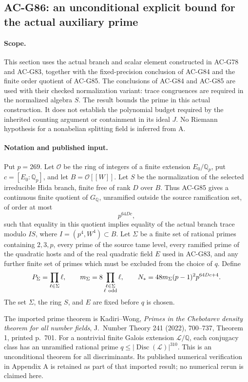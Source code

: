 \subsection{AC-G86: an unconditional explicit bound for the actual auxiliary prime}
\label{sec:cubic-effective-actual-prime}

\paragraph{Scope.}
This section uses the actual branch and scalar element constructed in AC-G78 and AC-G83, together with the fixed-precision conclusion of AC-G84 and the finite order quotient of AC-G85. The conclusions of AC-G84 and AC-G85 are used with their checked normalization variant: trace congruences are required in the normalized algebra \(S\). The result bounds the prime in this actual construction. It does not establish the polynomial budget required by the inherited counting argument or containment in its ideal \(J\). No Riemann hypothesis for a nonabelian splitting field is inferred from A.

\paragraph{Notation and published input.}
Put \(p=269\). Let \(\mathcal O\) be the ring of integers of a finite extension \(E_0/\mathbb Q_p\), put \(c=[E_0:\mathbb Q_p]\), and let \(B=\mathcal O[[W]]\). Let \(S\) be the normalization of the selected irreducible Hida branch, finite free of rank \(D\) over \(B\). Thus AC-G85 gives a continuous finite quotient of \(G_{\mathbb Q}\), unramified outside the source ramification set, of order at most
\[
 p^{64Dc},
\]
such that equality in this quotient implies equality of the actual branch trace modulo
\(I S\), where \(I=(p^4,W^4)\subset B\).
Let \(\Sigma\) be a finite set of rational primes containing \(2,3,p\), every prime of the source tame level, every ramified prime of the quadratic hosts and of the real quadratic field \(E\) used in AC-G83, and any further finite set of primes which must be excluded from the choice of \(q\). Define
\[
 P_\Sigma=\prod_{\ell\in\Sigma}\ell,\qquad
 m_\Sigma=8\prod_{\substack{\ell\in\Sigma\\\ell\ {\rm odd}}}\ell,
 \qquad
 N_*=48m_\Sigma(p-1)^2p^{64Dc+4}.
\]
The set \(\Sigma\), the ring \(S\), and \(E\) are fixed before \(q\) is chosen.

The imported prime theorem is Kadiri--Wong, \emph{Primes in the Chebotarev density theorem for all number fields}, J.\ Number Theory 241 (2022), 700--737, Theorem 1, printed p.\ 701. For a nontrivial finite Galois extension \(\mathcal L/\mathbb Q\), each conjugacy class has an unramified rational prime \(q\leq |\operatorname{Disc}(\mathcal L)|^{310}\). This is an unconditional theorem for all discriminants. Its published numerical verification in Appendix A is retained as part of that imported result; no numerical rerun is claimed here.

